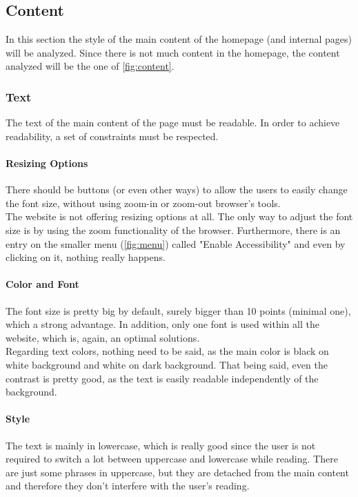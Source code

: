 \subsection{Content}
In this section the style of the main content of the homepage (and internal pages) will be analyzed. Since there is not much content in the homepage, the content analyzed will be the one of \cref{fig:content}.

\subsubsection{Text}
The text of the main content of the page must be readable. In order to achieve readability, a set of constraints must be respected.

\paragraph{Resizing Options}
There should be buttons (or even other ways) to allow the users to easily change the font size, without using zoom-in or zoom-out browser's tools.\\

The website is not offering resizing options at all. The only way to adjust the font size is by using the zoom functionality of the browser. Furthermore, there is an entry on the smaller menu (\cref{fig:menu}) called "Enable Accessibility" and even by clicking on it, nothing really happens.

\paragraph{Color and Font}
The font size is pretty big by default, surely bigger than 10 points (minimal one), which a strong advantage. In addition, only one font is used within all the website, which is, again, an optimal solutions.\\
Regarding text colors, nothing need to be said, as the main color is black on white background and white on dark background. That being said, even the contrast is pretty good, as the text is easily readable independently of the background.

\paragraph{Style}
The text is mainly in lowercase, which is really good since the user is not required to switch a lot between uppercase and lowercase while reading. There are just some phrases in uppercase, but they are detached from the main content and therefore they don't interfere with the user's reading.

